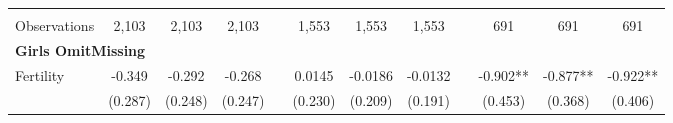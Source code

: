 \begin{landscape}
\begin{table}[htpb!]
\begin{center}
\begin{tabular}{lcccp{2mm}cccp{2mm}ccc}
\begin{footnotesize}\end{footnotesize}&\begin{footnotesize}\end{footnotesize}&\begin{footnotesize}\end{footnotesize}&\begin{footnotesize}\end{footnotesize}&\begin{footnotesize}\end{footnotesize}&\begin{footnotesize}\end{footnotesize}&\begin{footnotesize}\end{footnotesize}&\begin{footnotesize}\end{footnotesize}&\begin{footnotesize}\end{footnotesize}&\begin{footnotesize}\end{footnotesize}&\begin{footnotesize}\end{footnotesize}&\begin{footnotesize}\end{footnotesize}\\Observations&2,103&2,103&2,103&&1,553&1,553&1,553&&691&691&691\\
\multicolumn{12}{l}{\textbf{Girls OmitMissing}}\\ 
Fertility&-0.349&-0.292&-0.268&&0.0145&-0.0186&-0.0132&&-0.902**&-0.877**&-0.922**\\
&(0.287)&(0.248)&(0.247)&&(0.230)&(0.209)&(0.191)&&(0.453)&(0.368)&(0.406)\\

\end{tabular}
\end{center}
\end{table}
\end{landscape}
